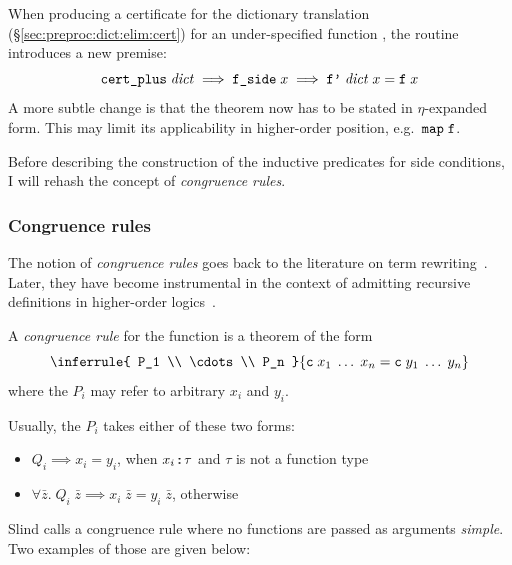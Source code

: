 \noindent
When producing a certificate for the dictionary translation (§\ref{sec:preproc:dict:elim:cert}) for an under-specified function , the routine introduces a new premise:
\[ \texttt{\textup{cert\_plus}}\;\mathit{dict} \implies \texttt{\textup{f\_side}}\;x \implies \texttt{\textup{f'}}\;\mathit{dict}\;x = \texttt{\textup{f}}\;x \]
A more subtle change is that the theorem now has to be stated in $\eta$-expanded form.
This may limit its applicability in higher-order position, e.g.\ $\texttt{\textup{map}}\;\texttt{\textup{f}}$.

Before describing the construction of the inductive predicates for side conditions, I will rehash the concept of \emph{congruence rules}.

\subsubsection{Congruence rules}
\label{sec:preproc:dict:partial:cong}

The notion of \emph{congruence rules} goes back to the literature on term rewriting~\cite{felty1992rewriting,felty1992conditional}.
Later, they have become instrumental in the context of admitting recursive definitions in higher-order logics~\cite{slind1999terminating,krauss2009fun,krauss2010recursive}.

\begin{definition}
  A \emph{congruence rule} for the function  is a theorem of the form
  \[
    \inferrule{
      P_1 \\
      \cdots \\
      P_n
    }{
      \holconst{c}\;x_1\;\ldots\;x_n = \holconst{c}\;y_1\;\ldots\;y_n
    }
  \]
  where the $P_i$ may refer to arbitrary $x_i$ and $y_i$.
\end{definition}

\noindent
Usually, the $P_i$ takes either of these two forms:
\begin{itemize}
  \item $Q_i \implies x_i = y_i$, when $x_i \mathbin{:\!\!:} \tau$ and $\tau$ is not a function type
  \item $\forall \bar{z}.\;Q_i\;\bar{z} \implies x_i\;\bar{z} = y_i\;\bar{z}$, otherwise
\end{itemize}

\noindent
Slind \cite[§2.7.1]{slind1999terminating} calls a congruence rule where no functions are passed as arguments \emph{simple}.
Two examples of those are given below:

